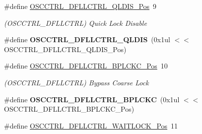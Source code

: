 \begin{DoxyCompactItemize}
\item 
\hypertarget{group___s_a_m_l21___o_s_c_c_t_r_l_ga9dece5c9f8faccc8b413d10ba00eecaa}{}\#define \hyperlink{group___s_a_m_l21___o_s_c_c_t_r_l_ga9dece5c9f8faccc8b413d10ba00eecaa}{O\+S\+C\+C\+T\+R\+L\+\_\+\+D\+F\+L\+L\+C\+T\+R\+L\+\_\+\+Q\+L\+D\+I\+S\+\_\+\+Pos}~9\label{group___s_a_m_l21___o_s_c_c_t_r_l_ga9dece5c9f8faccc8b413d10ba00eecaa}

\begin{DoxyCompactList}\small\item\em (O\+S\+C\+C\+T\+R\+L\+\_\+\+D\+F\+L\+L\+C\+T\+R\+L) Quick Lock Disable \end{DoxyCompactList}\item 
\hypertarget{group___s_a_m_l21___o_s_c_c_t_r_l_ga2aabc00814beb40848f9dd284a2ba583}{}\#define {\bfseries O\+S\+C\+C\+T\+R\+L\+\_\+\+D\+F\+L\+L\+C\+T\+R\+L\+\_\+\+Q\+L\+D\+I\+S}~(0x1ul $<$$<$ O\+S\+C\+C\+T\+R\+L\+\_\+\+D\+F\+L\+L\+C\+T\+R\+L\+\_\+\+Q\+L\+D\+I\+S\+\_\+\+Pos)\label{group___s_a_m_l21___o_s_c_c_t_r_l_ga2aabc00814beb40848f9dd284a2ba583}

\item 
\hypertarget{group___s_a_m_l21___o_s_c_c_t_r_l_ga475207fc73927f60219825c508a085cb}{}\#define \hyperlink{group___s_a_m_l21___o_s_c_c_t_r_l_ga475207fc73927f60219825c508a085cb}{O\+S\+C\+C\+T\+R\+L\+\_\+\+D\+F\+L\+L\+C\+T\+R\+L\+\_\+\+B\+P\+L\+C\+K\+C\+\_\+\+Pos}~10\label{group___s_a_m_l21___o_s_c_c_t_r_l_ga475207fc73927f60219825c508a085cb}

\begin{DoxyCompactList}\small\item\em (O\+S\+C\+C\+T\+R\+L\+\_\+\+D\+F\+L\+L\+C\+T\+R\+L) Bypass Coarse Lock \end{DoxyCompactList}\item 
\hypertarget{group___s_a_m_l21___o_s_c_c_t_r_l_ga9b5c8eb05784efe0bc2525e0c0aad222}{}\#define {\bfseries O\+S\+C\+C\+T\+R\+L\+\_\+\+D\+F\+L\+L\+C\+T\+R\+L\+\_\+\+B\+P\+L\+C\+K\+C}~(0x1ul $<$$<$ O\+S\+C\+C\+T\+R\+L\+\_\+\+D\+F\+L\+L\+C\+T\+R\+L\+\_\+\+B\+P\+L\+C\+K\+C\+\_\+\+Pos)\label{group___s_a_m_l21___o_s_c_c_t_r_l_ga9b5c8eb05784efe0bc2525e0c0aad222}

\item 
\hypertarget{group___s_a_m_l21___o_s_c_c_t_r_l_ga927a43121a13682345a34b77abd0aa55}{}\#define \hyperlink{group___s_a_m_l21___o_s_c_c_t_r_l_ga927a43121a13682345a34b77abd0aa55}{O\+S\+C\+C\+T\+R\+L\+\_\+\+D\+F\+L\+L\+C\+T\+R\+L\+\_\+\+W\+A\+I\+T\+L\+O\+C\+K\+\_\+\+Pos}~11\label{group___s_a_m_l21___o_s_c_c_t_r_l_ga927a43121a13682345a34b77abd0aa55}


\end{DoxyCompactItemize}
